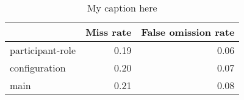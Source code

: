 \begin{table}[!ht]
\centering
\begin{tabular}{lrr}
\toprule
{} &  Miss rate &  False omission rate \\
\midrule
participant-role &       0.19 &                 0.06 \\
configuration    &       0.20 &                 0.07 \\
main             &       0.21 &                 0.08 \\
\bottomrule
\end{tabular}
\caption{My caption here}
\label{tab:unit-elements-transitivity-combined-errors}
\end{table}
